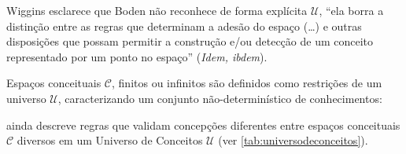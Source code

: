 Wiggins esclarece que Boden não reconhece de forma explícita $\mathcal{U}$, ``ela borra a distinção entre as regras que determinam a adesão do espaço (\ldots) e outras disposições que possam permitir a construção e/ou detecção de um conceito representado por um ponto no espaço'' (\emph{Idem, ibdem}).

Espaços conceituais $\mathcal{C}$, finitos ou infinitos são definidos como restrições de um universo $\mathcal{U}$, caracterizando um conjunto não-determinístico de conhecimentos: 

 ainda descreve regras que validam concepções diferentes entre espaços conceituais $\mathcal{C}$ diversos em um Universo de Conceitos $\mathcal{U}$ (ver \autoref{tab:universodeconceitos}).

